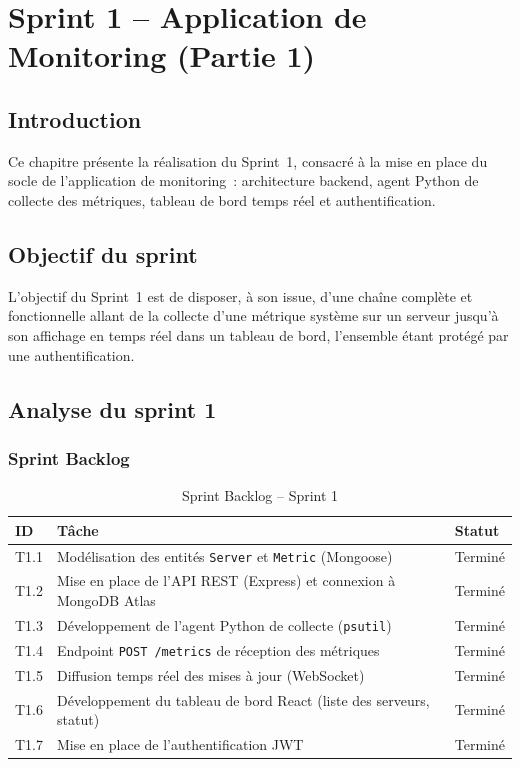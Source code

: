 \chapter{Sprint 1 -- Application de Monitoring (Partie 1)}
\label{chap-sprint1}

\section*{Introduction}

Ce chapitre présente la réalisation du Sprint~1, consacré à la mise en place du socle de l'application de monitoring~: architecture backend, agent Python de collecte des métriques, tableau de bord temps réel et authentification.

\section{Objectif du sprint}

L'objectif du Sprint~1 est de disposer, à son issue, d'une chaîne complète et fonctionnelle allant de la collecte d'une métrique système sur un serveur jusqu'à son affichage en temps réel dans un tableau de bord, l'ensemble étant protégé par une authentification.

\section{Analyse du sprint 1}

\subsection{Sprint Backlog}

\begin{table}[H]
\centering
\caption{Sprint Backlog -- Sprint 1}
\small
\begin{tabularx}{\linewidth}{@{}p{1.3cm}Xl@{}}
\toprule
\textbf{ID} & \textbf{Tâche} & \textbf{Statut} \\
\midrule
T1.1 & Modélisation des entités \texttt{Server} et \texttt{Metric} (Mongoose) & Terminé \\
T1.2 & Mise en place de l'API REST (Express) et connexion à MongoDB Atlas & Terminé \\
T1.3 & Développement de l'agent Python de collecte (\texttt{psutil}) & Terminé \\
T1.4 & Endpoint \texttt{POST /metrics} de réception des métriques & Terminé \\
T1.5 & Diffusion temps réel des mises à jour (WebSocket) & Terminé \\
T1.6 & Développement du tableau de bord React (liste des serveurs, statut) & Terminé \\
T1.7 & Mise en place de l'authentification JWT & Terminé \\
\bottomrule
\end{tabularx}
\end{table}

